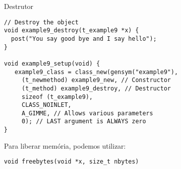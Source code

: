 \begin{frame}[fragile]{Destrutor}
\begin{lstlisting}
// Destroy the object
void example9_destroy(t_example9 *x) {
  post("You say good bye and I say hello");
}

void example9_setup(void) {
   example9_class = class_new(gensym("example9"),
     (t_newmethod) example9_new, // Constructor
     (t_method) example9_destroy, // Destructor
     sizeof (t_example9),
     CLASS_NOINLET,
     A_GIMME, // Allows various parameters
     0); // LAST argument is ALWAYS zero
}
\end{lstlisting}
Para liberar memória, podemos utilizar:
\begin{lstlisting}
void freebytes(void *x, size_t nbytes)
\end{lstlisting}
\end{frame}

